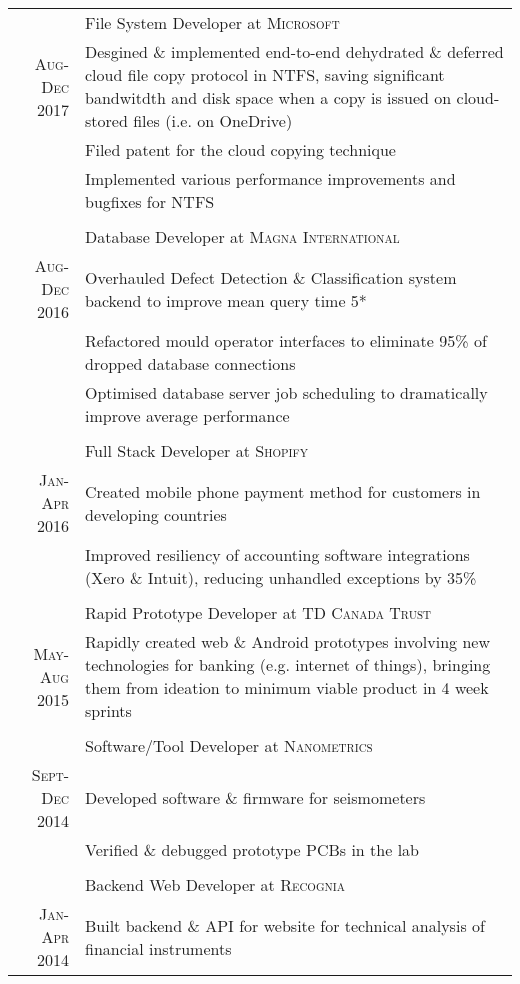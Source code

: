 \documentclass[a4paper,10pt]{article}
\begin{document}
\begin{tabular}{r|p{15.4cm}}
& File System Developer at \textsc{Microsoft} \\ \textsc{Aug-Dec 2017}
&\footnotesize{Desgined \& implemented end-to-end dehydrated \& deferred cloud file copy protocol in NTFS, saving significant bandwitdth and disk space when a copy is issued on cloud-stored files (i.e. on OneDrive)}\\
&\footnotesize{Filed patent for the cloud copying technique}\\
&\footnotesize{Implemented various performance improvements and bugfixes for NTFS}\\

\multicolumn{2}{c}{} \\
& Database Developer at \textsc{Magna International} \\ \textsc{Aug-Dec 2016}
&\footnotesize{Overhauled Defect Detection \& Classification system backend to improve mean query time 5*}\\
&\footnotesize{Refactored mould operator interfaces to eliminate 95\% of dropped database connections}\\
&\footnotesize{Optimised database server job scheduling to dramatically improve average performance}\\

\multicolumn{2}{c}{} \\
& Full Stack Developer at \textsc{Shopify} \\
\textsc{Jan-Apr 2016}
&\footnotesize{Created mobile phone payment method for customers in developing countries}\\
&\footnotesize{Improved resiliency of accounting software integrations (Xero \& Intuit), reducing unhandled exceptions by 35\%}\\

\multicolumn{2}{c}{} \\
& Rapid Prototype Developer at \textsc{TD Canada Trust}\\
\textsc{May-Aug 2015}
&\footnotesize{Rapidly created web \& Android prototypes involving new technologies for banking (e.g. internet of things), bringing them from ideation to minimum viable product in 4 week sprints}\\

\multicolumn{2}{c}{}\\
& Software/Tool Developer at \textsc{Nanometrics} \\
\textsc{Sept-Dec 2014}
&\footnotesize{Developed software \& firmware for seismometers}\\
&\footnotesize{Verified \& debugged prototype PCBs in the lab}\\

\multicolumn{2}{c}{} \\
& Backend Web Developer at \textsc{Recognia} \\
\textsc{Jan-Apr 2014}
& \footnotesize{Built backend \& API for website for technical analysis of financial instruments}
\end{tabular}
\end{document}
